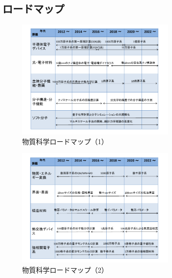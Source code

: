 \subsection{ロードマップ}
\begin{figure}[H]
  \centering
  \includegraphics[width=0.7\textwidth]{figs/4-2_rm_1.pdf}
  \caption{物質科学ロードマップ（1）}
  \label{fig:roadmap_4-2_1}
\end{figure}
\begin{figure}[H]
  \centering
  \includegraphics[width=0.7\textwidth]{figs/4-2_rm_2.pdf}
  \caption{物質科学ロードマップ（2）}
  \label{fig:roadmap_4-2_2}
\end{figure}

\nocite{*}


